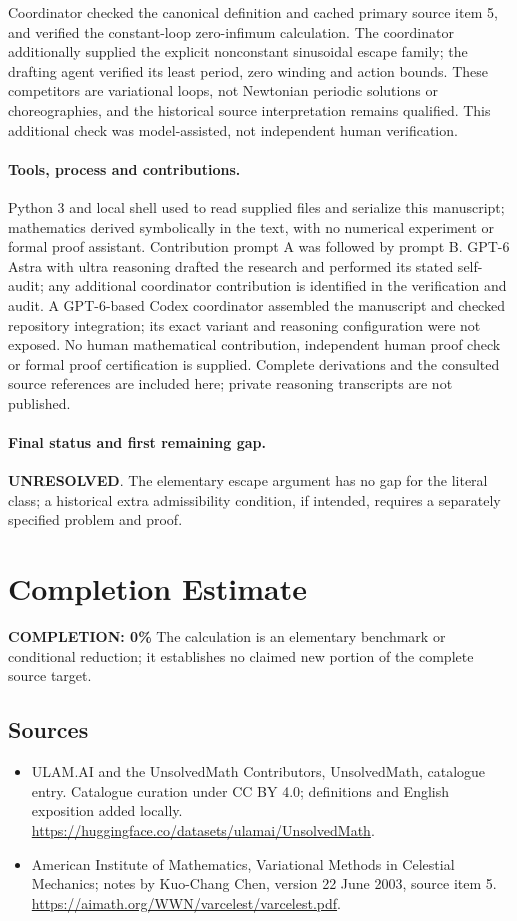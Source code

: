 \documentclass[11pt]{article}
\begin{document}
Coordinator checked the canonical definition and cached primary source item 5, and verified the constant-loop zero-infimum calculation. The coordinator additionally supplied the explicit nonconstant sinusoidal escape family; the drafting agent verified its least period, zero winding and action bounds. These competitors are variational loops, not Newtonian periodic solutions or choreographies, and the historical source interpretation remains qualified. This additional check was model-assisted, not independent human verification.

\paragraph{Tools, process and contributions.}
Python 3 and local shell used to read supplied files and serialize this manuscript; mathematics derived symbolically in the text, with no numerical experiment or formal proof assistant. Contribution prompt A was followed by prompt B. GPT-6 Astra with ultra reasoning drafted the research and performed its stated self-audit; any additional coordinator contribution is identified in the verification and audit. A GPT-6-based Codex coordinator assembled the manuscript and checked repository integration; its exact variant and reasoning configuration were not exposed. No human mathematical contribution, independent human proof check or formal proof certification is supplied. Complete derivations and the consulted source references are included here; private reasoning transcripts are not published.

\paragraph{Final status and first remaining gap.}
\textbf{UNRESOLVED}. The elementary escape argument has no gap for the literal class; a historical extra admissibility condition, if intended, requires a separately specified problem and proof.

\section{Completion Estimate}
\noindent\textbf{COMPLETION: 0\%}
The calculation is an elementary benchmark or conditional reduction; it establishes no claimed new portion of the complete source target.

\subsection{Sources}
\begin{itemize}
\item[\hypertarget{source:statement:1}{S1}] ULAM.AI and the UnsolvedMath Contributors, UnsolvedMath, catalogue entry. Catalogue curation under CC BY 4.0; definitions and English exposition added locally.
\url{https://huggingface.co/datasets/ulamai/UnsolvedMath}.
\item[\hypertarget{source:statement:2}{S2}] American Institute of Mathematics, Variational Methods in Celestial Mechanics; notes by Kuo-Chang Chen, version 22 June 2003, source item 5.
\url{https://aimath.org/WWN/varcelest/varcelest.pdf}.
\end{itemize}
\label{end:statement}
\end{document}
